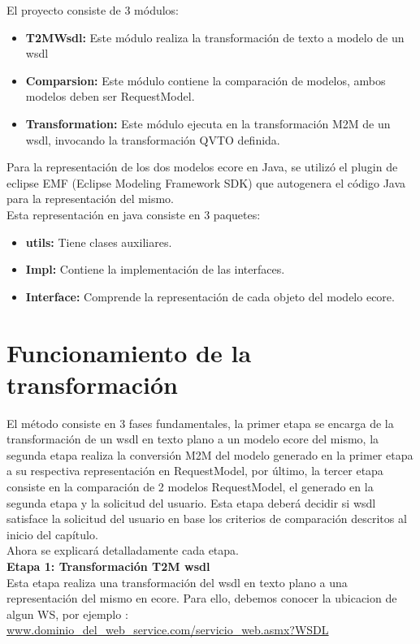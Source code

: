El proyecto consiste de 3 módulos:
\begin{itemize}
	\item \textbf{T2MWsdl:} Este módulo realiza la transformación de texto a modelo de un wsdl
	\item \textbf{Comparsion:} Este módulo contiene la comparación de modelos, ambos modelos deben ser RequestModel.
	\item \textbf{Transformation:} Este módulo ejecuta en la transformación M2M de un wsdl, invocando la transformación QVTO definida.
\end{itemize}

Para la representación de los dos modelos ecore en Java,  se utilizó el plugin de eclipse EMF (Eclipse Modeling Framework SDK) que autogenera el código Java para la representación del mismo.\\
Esta representación en java consiste en 3 paquetes:

\begin{itemize}
	\item \textbf{utils:} Tiene clases auxiliares.
	\item \textbf{Impl:} Contiene la implementación de las interfaces.
	\item \textbf{Interface:} Comprende la representación de cada objeto del modelo ecore.
\end{itemize}

\section{Funcionamiento de la transformación}

El método consiste en 3 fases fundamentales, la primer etapa se encarga de la transformación de un wsdl en texto plano a un modelo ecore del mismo, la segunda etapa realiza la conversión M2M del modelo generado en la primer etapa a su respectiva representación en RequestModel, por último, la tercer etapa consiste en la comparación de 2 modelos RequestModel, el generado en la segunda etapa y la solicitud del usuario. Esta etapa deberá decidir si wsdl satisface la solicitud del usuario en base los criterios de comparación descritos al inicio del capítulo. \\

Ahora se explicará detalladamente cada etapa.\\

\textbf{Etapa 1: Transformación T2M wsdl}\\

Esta etapa realiza una transformación del wsdl en texto plano a una representación del mismo en ecore. Para ello, debemos conocer la ubicacion de algun WS, por ejemplo : \url{www.dominio\_del\_web\_service.com/servicio\_web.asmx?WSDL}\\

